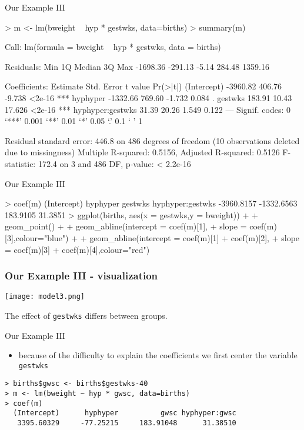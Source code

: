 \begin{frame}[fragile]{Our Example III}\scriptsize
\begin{semiverbatim}
> m <- lm(bweight ~ hyp * gestwks, data=births)
> summary(m)

Call:
lm(formula = bweight ~ hyp * gestwks, data = births)

Residuals:
     Min       1Q   Median       3Q      Max 
-1698.36  -291.13    -5.14   284.48  1359.16 

Coefficients:
                 Estimate Std. Error t value Pr(>|t|)    
(Intercept)      -3960.82     406.76  -9.738   <2e-16 ***
hyphyper         -1332.66     769.60  -1.732    0.084 .  
gestwks            183.91      10.43  17.626   <2e-16 ***
hyphyper:gestwks    31.39      20.26   1.549    0.122    
---
Signif. codes:  0 ‘***’ 0.001 ‘**’ 0.01 ‘*’ 0.05 ‘.’ 0.1 ‘ ’ 1

Residual standard error: 446.8 on 486 degrees of freedom
  (10 observations deleted due to missingness)
Multiple R-squared:  0.5156,	Adjusted R-squared:  0.5126 
F-statistic: 172.4 on 3 and 486 DF,  p-value: < 2.2e-16
\end{semiverbatim}
\end{frame}

\begin{frame}[fragile]{Our Example III}\scriptsize
\begin{semiverbatim}
> coef(m)
     (Intercept)         hyphyper          gestwks hyphyper:gestwks 
      -3960.8157       -1332.6563         183.9105          31.3851 
> ggplot(births, aes(x = gestwks,y = bweight)) +
+     geom_point() +
+     geom_abline(intercept = coef(m)[1],
+                 slope = coef(m)[3],colour="blue") +
+     geom_abline(intercept = coef(m)[1] + coef(m)[2],
+                 slope = coef(m)[3] + coef(m)[4],colour="red")
\end{semiverbatim}
\end{frame}


\begin{frame}[shrink=5]\frametitle{Our Example III - visualization}
\texttt{[image: model3.png]}

The effect of \texttt{gestwks} differs between groups. 
\end{frame}

\begin{frame}[fragile]{Our Example III}
  \begin{itemize}
  \item because of the difficulty to explain the coefficients we first center the variable \texttt{gestwks}
  \end{itemize}\scriptsize
\begin{verbatim}
> births$gwsc <- births$gestwks-40
> m <- lm(bweight ~ hyp * gwsc, data=births)
> coef(m)
  (Intercept)      hyphyper          gwsc hyphyper:gwsc 
   3395.60329     -77.25215     183.91048      31.38510 
\end{verbatim}
\end{frame}

